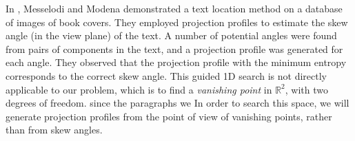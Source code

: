 In \cite{messelod1}, Messelodi and Modena demonstrated a text location method
on a database of images of book covers.  They employed projection profiles to
estimate the skew angle (in the view plane) of the text.
A number of potential angles were found from pairs of components in the text,
and a projection profile was generated for each angle.  They observed that the
projection profile with the minimum entropy corresponds to the correct skew
angle.  
This guided 1D search is not directly applicable to our problem, which is to
find a {\em vanishing point} in $\mathbb{R}^2$, with two degrees of freedom.  %
since the paragraphs we
In order to search this space, we will generate projection profiles
from the point of view of vanishing points, rather than from skew angles.



